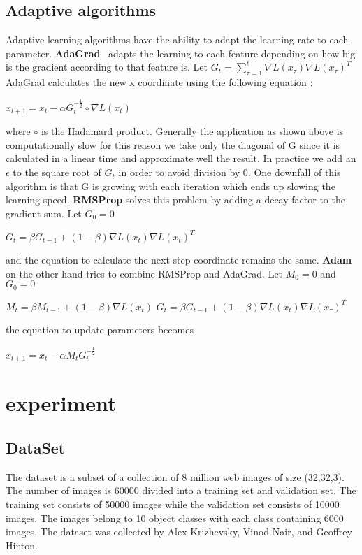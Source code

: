 \documentclass[sigconf]{acmart}
\begin{document}
\subsection{Adaptive algorithms}
Adaptive learning algorithms have the ability to adapt the learning rate to each parameter.
\newline \textbf{AdaGrad}~\cite{AdaGrad} adapts the learning to each feature depending on how big is the gradient according to that feature is. Let $G_t = \sum_{\tau=1}^{t} \nabla L(x_\tau) \nabla L(x_\tau)^T$ AdaGrad calculates the new x coordinate using the following equation :
\begin{center}
    $x_{t+1} = x_t -\alpha G_t^{-\frac{1}{2}}\circ \nabla L(x_t)$
\end{center}
where $\circ$ is the Hadamard product. Generally the application as shown above is computationally slow for this reason we take only the diagonal of G since it is calculated in a linear time and approximate well the result. In practice we add an $\epsilon$ to the square root of $G_t$ in order to avoid division by 0. One downfall of this algorithm is that G is growing with each iteration which ends up slowing the learning speed.
\newline \textbf{RMSProp}\cite{RMSProp} solves this problem by adding a decay factor to the gradient sum. Let $G_0=0$
\begin{center}
    $G_t = \beta G_{t-1} + (1-\beta) \nabla L(x_t) \nabla L(x_t)^T$
\end{center}
and the equation to calculate the next step coordinate remains the same.
\newline  \textbf{Adam}\cite{kingma2014adam} on the other hand tries to combine RMSProp and AdaGrad. Let $M_0 = 0$ and $G_0=0$
\begin{center}
    $M_t = \beta M_{t-1} + (1-\beta) \nabla L(x_t)$
    $G_t = \beta G_{t-1} + (1-\beta) \nabla L(x_t) \nabla L(x_\tau)^T$
\end{center}
the equation to update parameters becomes
\begin{center}
    $x_{t+1} = x_t -\alpha M_t G_t^{-\frac{1}{2}}$ 
\end{center}


\section{experiment}

\subsection{DataSet}
The dataset is a subset of a collection of 8 million web images of size (32,32,3). The number of images is 60000 divided into a training set and validation set. The training set consists of 50000 images while the validation set consists of 10000 images. The images belong to 10 object classes with each class containing 6000 images. The dataset was collected by Alex Krizhevsky, Vinod Nair, and Geoffrey Hinton.
\end{document}
